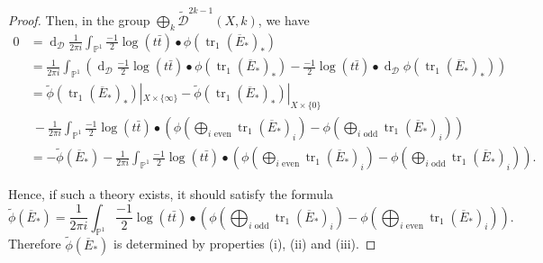 \documentclass[10pt,twoside]{article}
\numberwithin{equation}{section}
\theoremstyle{plain}
\theoremstyle{definition}
\DeclareMathOperator{\tr}{tr}
\DeclareMathOperator{\dd}{d}
\begin{document}
\begin{proof}
Then, in the group
$\bigoplus_{k}\widetilde{\mathcal{D}}^{2k-1}(X,k)$, we have
\begin{align*}
  0
  &=\dd_{\mathcal{D}} \frac{1}
  {2\pi
    i}\int_{\mathbb{P}^{1}}\frac{-1}{2}\log(t\bar{t}) \bullet
  \phi(\tr_{1}(\overline{E}_{\ast})_{\ast}) 
  \\
  &=\frac{1}
  {2\pi
    i}\int_{\mathbb{P}^{1}}\left(\dd_{\mathcal{D}}\frac{-1}{2}\log(t\bar{t})
  \bullet \phi(\tr_{1}(\overline{E}_{\ast})_{\ast}) -
  \frac{-1}{2}\log(t\bar{t})\bullet
  \dd_{\mathcal{D}}\phi(\tr_{1}(\overline{E}_{\ast})_{\ast})\right)\\ 
  &= \widetilde{\phi}(\tr_{1}(\overline{E}_{\ast})_{\ast})|_{X\times
    \{\infty\}}
  -\widetilde{\phi}(\tr_{1}(\overline{E}_{\ast})_{\ast})|_{X\times
    \{0\}}\\
  &\phantom{\ }-\frac{1}
  {2\pi
    i}\int_{\mathbb{P}^{1}}\frac{-1}{2}\log(t\bar{t}) \bullet 
  (\phi(\bigoplus_{i\text{ even}}\tr_{1}(\overline{E}_{\ast})_{i})- 
  \phi
  (\bigoplus_{i\text{ odd}}\tr_{1}(\overline{E}_{\ast})_{i}))\\
  &=  -\widetilde{\phi}(\overline{E}_{\ast}) -\frac{1}
  {2\pi
    i}\int_{\mathbb{P}^{1}}\frac{-1}{2}\log(t\bar{t}) \bullet 
  (\phi(\bigoplus_{i\text{ even}}\tr_{1}(\overline{E}_{\ast})_{i})- 
  \phi
  (\bigoplus_{i\text{ odd}}\tr_{1}(\overline{E}_{\ast})_{i})
  ).
\end{align*}

Hence, if such a theory exists, it should satisfy the formula
\begin{equation}
  \label{eq:7}
  \widetilde{\phi}(\overline{E}_{\ast})=
 \frac{1}
  {2\pi
    i}\int_{\mathbb{P}^{1}}\frac{-1}{2}\log(t\bar{t}) \bullet 
  (\phi(\bigoplus_{i\text{ odd}}\tr_{1}(\overline{E}_{\ast})_{i})- 
  \phi
  (\bigoplus_{i\text{ even}}\tr_{1}(\overline{E}_{\ast})_{i})
  ).
\end{equation}
Therefore $ \widetilde{\phi}(\overline{E}_{\ast})$ is determined by properties (i), (ii) and
(iii). 


\end{proof}
\end{document}
